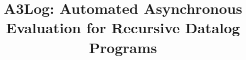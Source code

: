 \documentclass{vldb}
\begin{document}
%
\title{A3Log: Automated Asynchronous Evaluation for Recursive Datalog Programs}



%
\author{}

\maketitle


\begin{abstract}


\end{abstract}




\newcommand{\Paragraph}[1]{\smallskip\noindent{\bf #1.}}
\newtheorem{theorem}{\textbf{Theorem}}
\newtheorem{lemma}{\textbf{Lemma}}
\end{document}

